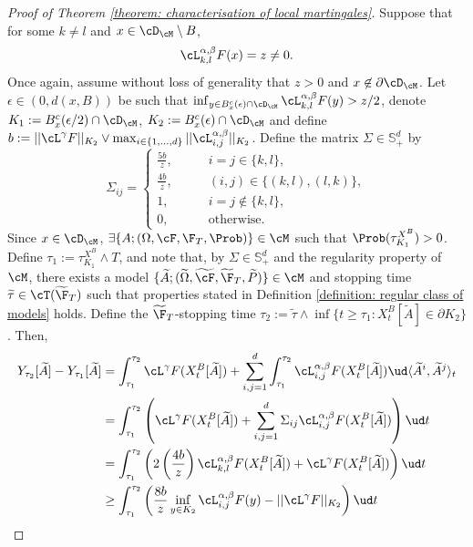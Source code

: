 \documentclass[11pt]{article}
\begin{document}
\begin{proof}[Proof of Theorem \ref{theorem: characterisation of local martingales}]
Suppose that for some $k \neq l$ and $x \in \cD_{\cM} \setminus B$,
$$
\cL^{\alpha,\beta}_{k,l} F(x) = z \neq 0.
$$
Once again, assume without loss of generality that $z > 0$ and $x \not\in \partial \cD_\cM$. Let $\epsilon \in (0, d(x,B))$ be such that $\inf_{y \in B^c_x(\epsilon) \cap \cD_{\cM}} \cL^{\alpha,\beta}_{k,l} F(y) > z/2$, denote $K_1 := B^c_x(\epsilon/2) \cap \cD_{\cM}$, $K_2 := B^c_x(\epsilon) \cap \cD_{\cM}$ and define $b := || \cL^\gamma F ||_{K_2} \vee \max_{i \in \{1,\ldots,d\}} || \cL^{\alpha,\beta}_{i,j} ||_{K_2}$. Define the matrix $\Sigma \in \mathbb{S}^d_+$ by
$$
\Sigma_{ij} = 
\begin{cases}
\frac{5b}{z}, \qquad& i = j \in \{k,l\}, \\
\frac{4b}{z}, & (i,j) \in \{(k,l), (l,k)\}, \\
1, & i = j \not\in \{k,l\}, \\
0, & \textrm{otherwise}.
\end{cases}
$$
Since $x \in \cD_{\cM}$, $\exists \{ A; (\Omega, \cF, \F_T, \Prob) \} \in \cM$ such that $\Prob(\tau^{X^B}_{K_1}) > 0$. Define $\tau_1 := \tau^{X^B}_{K_1} \wedge T$, and note that, by $\Sigma \in \mathbb{S}^d_+$ and the regularity property of $\cM$, there exists a model $\{ \widetilde{A} ; (\widetilde{\Omega}, \widetilde{\cF}, \widetilde{\F}_T, \widetilde{P}) \} \in \cM$ and stopping time $\widetilde{\tau} \in \cT(\widetilde{\F}_T)$ such that properties stated in Definition \ref{definition: regular class of models} holds. Define the $\widetilde{\F}_T$-stopping time $\tau_2 := \widetilde{\tau} \wedge \inf\{ t \geq \tau_1 : X^B_t[\widetilde{A}] \in \partial K_2 \}$. Then,
\begin{align*}
Y_{\tau_2}[\widetilde{A}] - Y_{\tau_1}[\widetilde{A}] &= \int_{\tau_1}^{\tau_2} \cL^\gamma F(X^B_t[\widetilde{A}]) + \sum_{i,j=1}^d  \int_{\tau_1}^{\tau_2} \cL^{\alpha,\beta}_{i,j} F(X^B_t[\widetilde{A}]) \ud \langle \widetilde{A}^i, \widetilde{A}^j \rangle_t \\
&= \int_{\tau_1}^{\tau_2} \left( \cL^\gamma F(X^B_t[\widetilde{A}]) + \sum_{i,j=1}^d \Sigma_{ij} \cL^{\alpha,\beta}_{i,j} F(X^B_t[\widetilde{A}]) \right) \ud t \\
&= \int_{\tau_1}^{\tau_2} \left( 2 \left( \frac{4b}{z} \right) \cL^{\alpha,\beta}_{k,l} F(X^B_t[\widetilde{A}]) + \cL^\gamma F(X^B_t[\widetilde{A}]) \right) \ud t \\
&\geq \int_{\tau_1}^{\tau_2} \left( \frac{8b}{z} \inf_{y \in K_2} \cL^{\alpha,\beta}_{i,j} F(y) - || \cL^\gamma F||_{K_2} \right) \ud t \\

\end{align*}
\end{proof}
\end{document}
